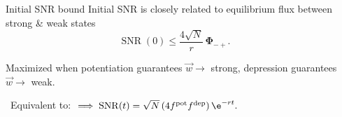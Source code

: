 \documentclass[final,hyperref={pdfpagelabels=false,bookmarks=false}]{beamer}
\DeclareMathOperator{\SNR}{SNR}
\DeclareMathOperator{\snr}{SNR}
\newcommand{\pot}{^\text{pot}}
\newcommand{\dep}{^\text{dep}}
\newcommand{\W}{\vec{w}}
\newcommand{\F}{\boldsymbol{\Phi}}
\begin{document}
\begin{frame}{}
\begin{columns}[t]
\begin{column}{0.415\linewidth}
\end{column}

\begin{column}{0.3\linewidth}



\begin{block}{Initial SNR bound}
%
 Initial SNR is closely related to equilibrium flux between strong \& weak states
 \begin{equation*}
   \SNR(0) \leq \frac{4\sqrt{N}}{r}\,\F_{-+}.
 \end{equation*}

 \vp
 Maximized when %
 potentiation guarantees $\W\to$ strong, %
 depression guarantees $\W\to$ weak.
%
 \begin{center}
   \hspace{0.5cm}
   \hspace{1cm}
  \lto\ Equivalent to:
   \hspace{0.5cm}
   $\implies\snr(t)=\sqrt{N}\,(4 f\pot f\dep)\,\e^{-rt}.$
  \end{center}


\end{block}
\end{column}
\end{columns}
\end{frame}
\end{document}
